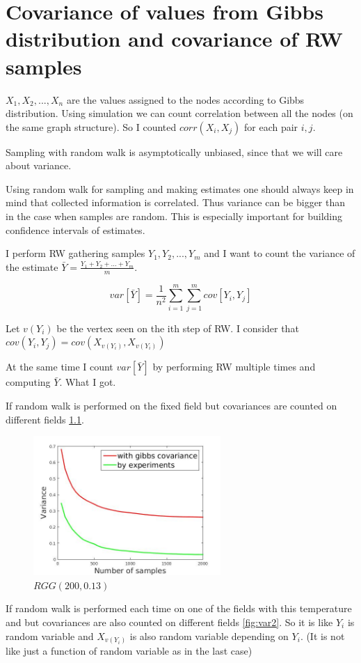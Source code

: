 \documentclass[12pt]{report}
\begin{document}
\chapter{Covariance of values from Gibbs distribution and covariance of RW samples}

$X_1, X_2, ..., X_n$ are the values assigned to the nodes according to Gibbs distribution. Using simulation we can count correlation between all the nodes (on the same graph structure). So I counted $corr(X_i, X_j)$ for each pair $i, j$.

Sampling with random walk is asymptotically unbiased, since that we will care about variance.

Using random walk for sampling and making estimates one should always keep in mind that collected information is correlated. Thus variance can be bigger than in the case when samples are random. This is especially important for building confidence intervals of estimates.

I perform RW gathering samples $Y_1, Y_2, ..., Y_m$ and I want to count the variance of the estimate $\bar{Y} = \frac{Y_1 + Y_2 + ... + Y_m}{m}$.

$$var[\bar{Y}] = \frac{1}{n^2}\sum_{i=1}^m \sum_{j=1}^m cov[Y_i, Y_j]$$

Let $v(Y_i)$ be the vertex seen on the ith step of RW. 
I consider that $ cov(Y_{i}, Y_{j}) = cov(X_{v(Y_i)}, X_{v(Y_i)})$

At the same time I count $var[\bar{Y}]$ by performing RW multiple times and computing $\bar{Y}$. What I got.

If random walk is performed on the fixed field but covariances are counted on different fields \ref{fig:var1}. 

\begin{figure}[ht]
    \centering
    \includegraphics[height=200px]{varExperGibbsBad}
    \caption{ $RGG (200, 0.13)$}
    \label{fig:var1}
\end{figure}

If random walk is performed each time on one of the fields with this temperature and but covariances are also counted on different fields \ref{fig:var2}. So it is like $Y_{i}$ is random variable and $X_{v(Y_i)}$ is also random variable depending on $Y_{i}$. (It is not like just a function of random variable as in the last case)
\end{document}
